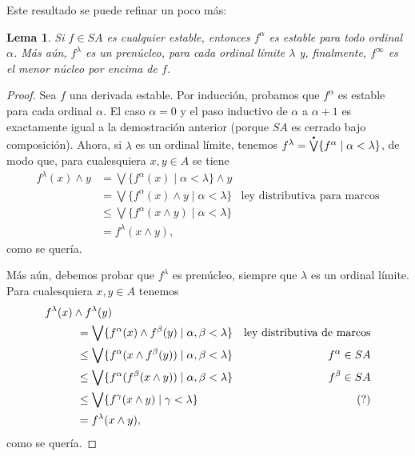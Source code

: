 \documentclass[12pt,letterpaper,titlepage]{article}
\newtheorem{lemma}{Lema}
\theoremstyle{definition}
\newcommand\Sup{\bigvee}
\renewcommand\inf{\wedge}
\newcommand\pSup{%
    {\stackrel{\raisebox{-3pt}{\scalebox{0.5}{$\bullet$}}}{\bigvee}}
  }%
\newcommand\<{\langle}
\renewcommand\>{\rangle}
\begin{document}
Este resultado se puede refinar un poco más:
\begin{lemma}
  Si $f\in SA$ es cualquier estable, entonces $f^\alpha$ es
  estable para todo ordinal $\alpha$.
  Más aún, $f^\lambda$ es un prenúcleo, para cada ordinal límite
  $\lambda$ y, finalmente, $f^\infty$ es el menor núcleo por
  encima de $f$.
\end{lemma}
\begin{proof}
  Sea $f$ una derivada estable.
  Por inducción, probamos que $f^\alpha$ es estable para cada
  ordinal $\alpha$.
  El caso $\alpha=0$ y el paso inductivo de $\alpha$ a $\alpha+1$
  es exactamente igual a la demostración anterior (porque $SA$ es
  cerrado bajo composición).
  Ahora, si $\lambda$ es un ordinal límite, tenemos
  $f^\lambda = \pSup\{f^\alpha \mid \alpha < \lambda\}$, de modo
  que, para cualesquiera $x,y\in A$ se tiene
  \begin{align*}
    f^\lambda(x)\inf y
    &= \Sup\{f^\alpha(x) \mid \alpha <\lambda\} \inf y \\
    &= \Sup\{f^\alpha(x)\inf y\mid \alpha <\lambda\}
      & \text{ley distributiva para marcos} \\
    &\leq \Sup\{f^\alpha(x\inf y)\mid \alpha <\lambda\} \\
    &= f^\lambda(x\inf y),
  \end{align*}
  como se quería.

  Más aún, debemos probar que $f^\lambda$ es prenúcleo, siempre
  que $\lambda$ es un ordinal límite.
  Para cualesquiera $x,y\in A$ tenemos
  \begin{align*}
    &f^\lambda(x)\inf f^\lambda(y) \\
    &\hspace{10mm}
    = \Sup\{f^\alpha(x)\inf f^\beta(y) \mid \alpha,\beta <\lambda\}
      & \text{ley distributiva de marcos} \\
    &\hspace{10mm}
    \leq \Sup\{f^\alpha(x\inf f^\beta(y)) \mid \alpha,\beta <\lambda\}
      & f^\alpha \in SA \\
    &\hspace{10mm}
    \leq \Sup\{f^\alpha(f^\beta(x\inf y)) \mid \alpha,\beta <\lambda\}
      & f^\beta \in SA \\
    &\hspace{10mm}
    \leq \Sup\{f^\gamma(x\inf y) \mid \gamma<\lambda\}
      & (?) \\
    &\hspace{10mm}
    = f^\lambda(x\inf y),
  \end{align*}
  como se quería.
\end{proof}
\end{document}
